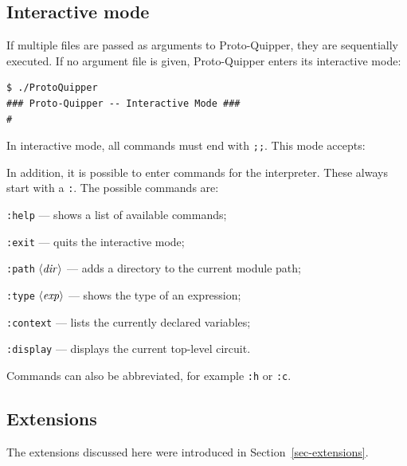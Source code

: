 \subsection{Interactive mode}

If multiple files are passed as arguments to Proto-Quipper, they 
are sequentially executed. If no argument file is given, Proto-Quipper 
enters its interactive mode:
\begin{verbatim}
$ ./ProtoQuipper
### Proto-Quipper -- Interactive Mode ###
# 
\end{verbatim}
In interactive mode, all commands must end with \verb#;;#. This mode accepts:
In addition, it is possible to enter commands for the
interpreter. These always start with a \verb#:#. The possible commands are:
\begin{compactitemize}
  \item \verb#:help# --- shows a list of available commands;
  \item \verb#:exit# --- quits the interactive mode;
  \item \verb#:path# $\langle{\it dir}\rangle$ --- adds a directory to the
    current module path;
  \item \verb#:type# $\langle{\it exp}\rangle$ --- shows the type of an expression;
  \item \verb#:context# --- lists the currently declared variables;
  \item \verb#:display# --- displays the current top-level circuit.
\end{compactitemize}
Commands can also be abbreviated, for example \verb#:h# or \verb#:c#.

\subsection{Extensions}

The extensions discussed here were introduced in
Section~\hyperref[sec-extensions]{\ref*{sec-extensions}}.

